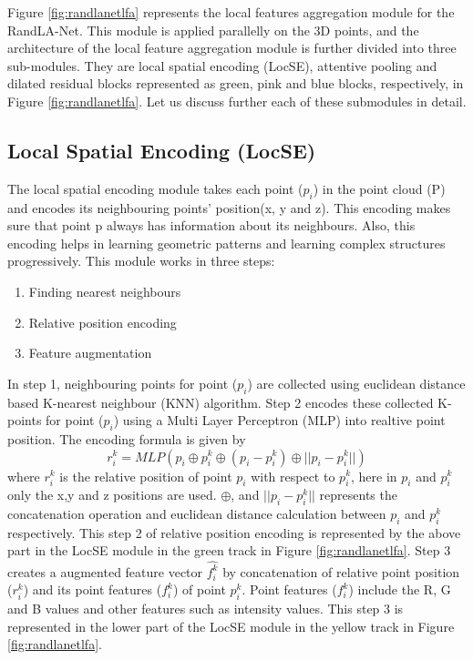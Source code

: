 Figure \ref{fig:randlanetlfa} represents the local features aggregation module for the RandLA-Net.
This module is applied parallelly on the 3D points, and the architecture of the local feature aggregation module is further divided into three sub-modules.
They are local spatial encoding (LocSE), attentive pooling and dilated residual blocks represented as green, pink and blue blocks, respectively, in Figure \ref{fig:randlanetlfa}.
Let us discuss further each of these submodules in detail.

\subsection{Local Spatial Encoding (LocSE)}
The local spatial encoding module takes each point ($p_i$) in the point cloud (P) and encodes its neighbouring points' position(x, y and z).
This encoding makes sure that point p always has information about its neighbours.
Also, this encoding helps in learning geometric patterns and learning complex structures progressively.
This module works in three steps:
\begin{enumerate}
    \item Finding nearest neighbours
    \item Relative position encoding
    \item Feature augmentation
\end{enumerate}

In step 1, neighbouring points for point ($p_i$) are collected using euclidean distance based K-nearest neighbour (KNN) algorithm.
Step 2 encodes these collected K-points for point ($p_i$) using a Multi Layer Perceptron (MLP) into realtive point position. The encoding formula is given by
$$
r_i^k = MLP(p_i \oplus p_i^k \oplus (p_i - p_i^k) \oplus ||p_i-p_i^k||)
$$
where $r_i^k$ is the relative position of point $p_i$ with respect to $p_i^k$, here in $p_i$ and $p_i^k$ only the x,y and z positions are used.
$\oplus$, and $||p_i-p_i^k||$ represents the concatenation operation and euclidean distance calculation between $p_i$ and $p_i^k$ respectively.
This step 2 of relative position encoding is represented by the above part in the LocSE module in the green track in Figure \ref{fig:randlanetlfa}.
Step 3 creates a augmented feature vector $\hat{f_i^k}$ by concatenation of relative point position ($r_i^k$) and its point features ($f_i^k$) of point $p_i^k$.
Point features ($f_i^k$) include the R, G and B values and other features such as intensity values.
This step 3 is represented in the lower part of the LocSE module in the yellow track in Figure \ref{fig:randlanetlfa}.
